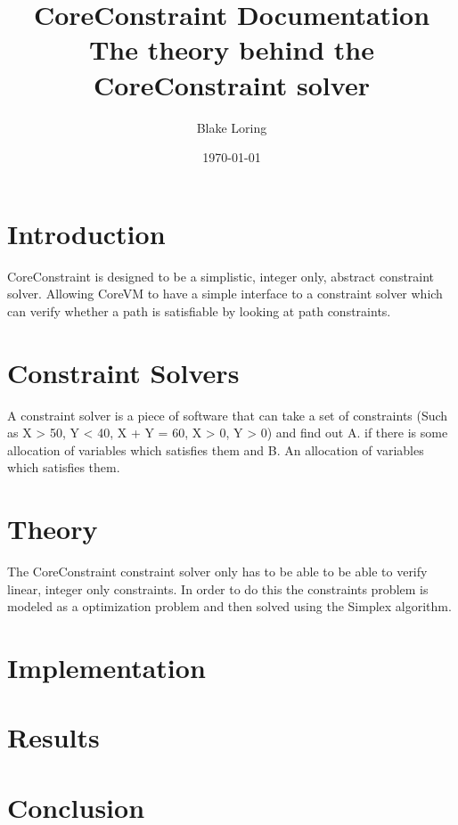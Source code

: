 \documentclass{report}
\begin{document}
\title{CoreConstraint Documentation \\ \large The theory behind the CoreConstraint solver}
\author{Blake Loring}
\date{\today}

\maketitle

\chapter {Introduction}

CoreConstraint is designed to be a simplistic, integer only, abstract constraint solver. Allowing CoreVM to have a simple interface to a constraint solver which can verify whether a path is satisfiable by looking at path constraints.

\chapter {Constraint Solvers}

A constraint solver is a piece of software that can take a set of constraints (Such as X > 50, Y < 40, X + Y = 60, X > 0, Y > 0) and find out A. if there is some allocation of variables which satisfies them and B. An allocation of variables which satisfies them.

\chapter {Theory}

The CoreConstraint constraint solver only has to be able to be able to verify linear, integer only constraints. In order to do this the constraints problem is modeled as a optimization problem and then solved using the Simplex algorithm.

\chapter {Implementation}
\chapter {Results}
\chapter {Conclusion}
\end{document}
